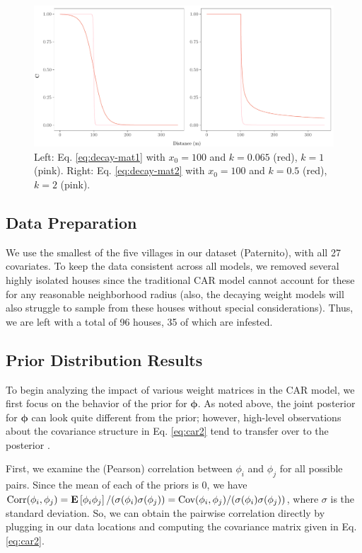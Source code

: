\documentclass{scrartcl}
\newcommand{\todo}[1]{\textcolor{red}{TODO:
    #1}\PackageWarning{TODO:}{#1!}}
\newcommand{\expect}[1]{\operatorname{\textnormal{\textbf{E}}}\left[#1\right]}
\newcommand{\mat}[1]{\bm{#1}}
\begin{document}
\begin{figure}
  \centering
  \includegraphics[width=.75\linewidth]{fig1}
  \caption{Left: Eq. \eqref{eq:decay-mat1} with $x_0 = 100$ and
    $k = 0.065$ (red), $k = 1$ (pink). Right:
    Eq. \eqref{eq:decay-mat2} with $x_0 = 100$ and $k = 0.5$ (red),
    $k = 2$ (pink).}
  \label{fig:fig1}
\end{figure}

\subsection{Data Preparation}
\label{sec:spatial-data}

We use the smallest of the five villages in our dataset (Paternito),
with all 27 covariates. 
To keep the data consistent across all models, we removed
several highly isolated houses since the traditional CAR model cannot
account for these for any reasonable neighborhood radius (also, the
decaying weight models will also struggle to sample from these houses
without special considerations). Thus, we are left with a total of 96
houses, 35 of which are infested.

\subsection{Prior Distribution Results}
\label{sec:prior-distr-results}

To begin analyzing the impact of various weight matrices in the CAR
model, we first focus on the behavior of the prior for
$\mat{\phi}$. As noted above, the joint posterior for $\mat{\phi}$ can
look quite different from the prior; however, high-level observations
about the covariance structure in Eq. \eqref{eq:car2} tend to transfer
over to the posterior \cite{Assuncao2009}.

First, we examine the (Pearson) correlation between $\phi_i$ and
$\phi_j$ for all possible pairs. Since the mean of each of the priors
is 0, we have
$\text{Corr}(\phi_i, \phi_j) = \expect{\phi_i \phi_j} /
(\sigma(\phi_i) \sigma(\phi_j)) = \text{Cov}(\phi_i, \phi_j) /
(\sigma(\phi_i) \sigma(\phi_j))$, where $\sigma$ is the standard
deviation. So, we can obtain the pairwise correlation directly by
plugging in our data locations and computing the covariance matrix
given in Eq. \eqref{eq:car2}.
\end{document}
